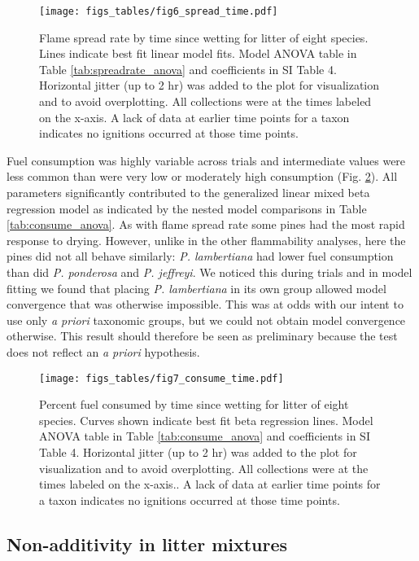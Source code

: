 \documentclass[letterpaper,12pt]{article}
\begin{document}
\begin{figure}[h]
  \centering
\texttt{[image: figs\_tables/fig6\_spread\_time.pdf]}
\caption{Flame spread rate by time since wetting for litter of eight species.
  Lines indicate best fit linear model fits. Model ANOVA table in Table
  \ref{tab:spreadrate_anova} and coefficients in SI Table 4. Horizontal jitter
  (up to 2 hr) was added to the plot for visualization and to avoid
  overplotting. All collections were at the times labeled on the x-axis. A lack
  of data at earlier time points for a taxon indicates no ignitions occurred at
  those time points.}
\label{fig:spread_time}
\end{figure}

Fuel consumption was highly variable across trials and intermediate values were
less common than were very low or moderately high consumption (Fig.
\ref{fig:consume_time}). All parameters significantly contributed to the
generalized linear mixed beta regression model as indicated by the nested model
comparisons in Table \ref{tab:consume_anova}. As with flame spread rate
some pines had the most rapid response to drying. However, unlike in the other
flammability analyses, here the pines did not all behave similarly: \emph{P.
  lambertiana} had lower fuel consumption than did \emph{P. ponderosa} and
\emph{P. jeffreyi}. We noticed this during trials and in model fitting we
found that placing \emph{P. lambertiana} in its own group allowed model
convergence that was otherwise impossible. This was at odds with our intent to
use only \emph{a priori} taxonomic groups, but we could not obtain model
convergence otherwise. This result should therefore be seen as preliminary
because the test does not reflect an \emph{a priori} hypothesis.


\begin{figure}[h]
  \centering
\texttt{[image: figs\_tables/fig7\_consume\_time.pdf]}
\caption{Percent fuel consumed by time since wetting for litter of eight
  species. Curves shown indicate best fit beta regression lines. Model ANOVA
  table in Table \ref{tab:consume_anova} and coefficients in SI Table 4.
  Horizontal jitter (up to 2 hr) was added to the plot for visualization and to
  avoid overplotting. All collections were at the times labeled on the x-axis..
  A lack of data at earlier time points for a taxon indicates no ignitions
  occurred at those time points.}
  \label{fig:consume_time}
\end{figure}


\subsection*{Non-additivity in  litter mixtures}
\end{document}
